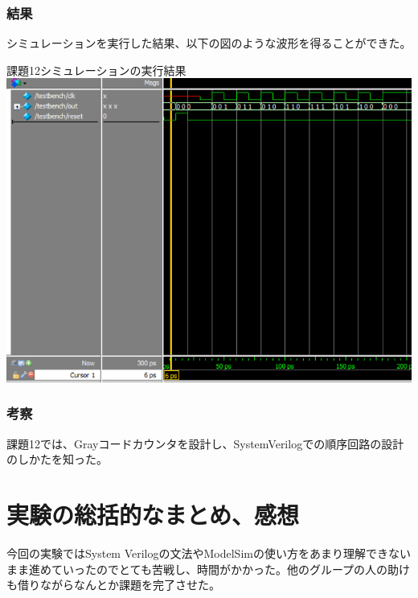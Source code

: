 \documentclass[a4paper]{jarticle}
\begin{document}
\subsubsection{結果}
シミュレーションを実行した結果、以下の図のような波形を得ることができた。
\begin{center}
	課題12シミュレーションの実行結果
	\includegraphics[width=15cm]{12-m-1.PNG}
\end{center}
\subsubsection{考察}
課題12では、Grayコードカウンタを設計し、SystemVerilogでの順序回路の設計のしかたを知った。
\section{実験の総括的なまとめ、感想}
今回の実験ではSystem Verilogの文法やModelSimの使い方をあまり理解できないまま進めていったのでとても苦戦し、時間がかかった。他のグループの人の助けも借りながらなんとか課題を完了させた。
\end{document}
